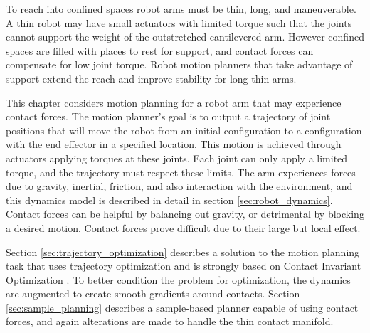 \documentclass[../thesis.tex]{subfiles}
\begin{document}
To reach into confined spaces robot arms must be thin, long, and maneuverable.
A thin robot may have small actuators with limited torque such that the joints cannot support the weight of the outstretched cantilevered arm.
However confined spaces are filled with places to rest for support, and contact forces can compensate for low joint torque. 
Robot motion planners that take advantage of support extend the reach and improve stability for long thin arms.

This chapter considers motion planning for a robot arm that may experience contact forces.
The motion planner's goal is to output a trajectory of joint positions that will move the robot from an initial configuration to a configuration with the end effector in a specified location.
This motion is achieved through actuators applying torques at these joints.
Each joint can only apply a limited torque, and the trajectory must respect these limits.
The arm experiences forces due to gravity, inertial, friction, and also interaction with the environment, and this dynamics model is described in detail in section \ref{sec:robot_dynamics}.
Contact forces can be helpful by balancing out gravity, or detrimental by blocking a desired motion.
Contact forces prove difficult due to their large but local effect.


Section \ref{sec:trajectory_optimization} describes a solution to the motion planning task that uses trajectory optimization and is strongly based on Contact Invariant Optimization \cite{Mordatch2012}.
To better condition the problem for optimization, the dynamics are augmented to create smooth gradients around contacts.
Section \ref{sec:sample_planning} describes a sample-based planner capable of using contact forces, and again alterations are made to handle the thin contact manifold.







\end{document}
